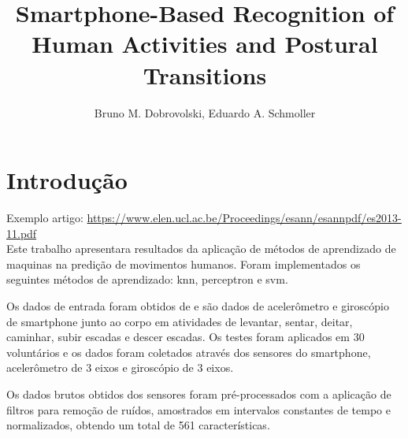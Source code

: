 \documentclass[12pt]{article}
\title{Smartphone-Based Recognition of Human Activities and Postural Transitions}
\author{Bruno M. Dobrovolski\inst{1}, Eduardo A. Schmoller\inst{1}}
\begin{document}
 

\maketitle

%

\section{Introdução}

	Exemplo artigo: \url{https://www.elen.ucl.ac.be/Proceedings/esann/esannpdf/es2013-11.pdf}\\

	Este trabalho apresentara resultados da aplicação de métodos de aprendizado de maquinas na predição de movimentos humanos. Foram implementados os seguintes métodos de aprendizado: knn, perceptron e svm. 
	
	Os dados de entrada foram obtidos de \cite{Dua:2017} e são dados de acelerômetro e giroscópio de smartphone junto ao corpo em atividades de levantar, sentar, deitar, caminhar, subir escadas e descer escadas. Os testes foram aplicados em 30 voluntários e os dados foram coletados através dos sensores do smartphone, acelerômetro de 3 eixos e giroscópio de 3 eixos.
	
	Os dados brutos obtidos dos sensores foram pré-processados com a aplicação de filtros para remoção de ruídos, amostrados em intervalos constantes de tempo e normalizados, obtendo um total de 561 características.
\end{document}
